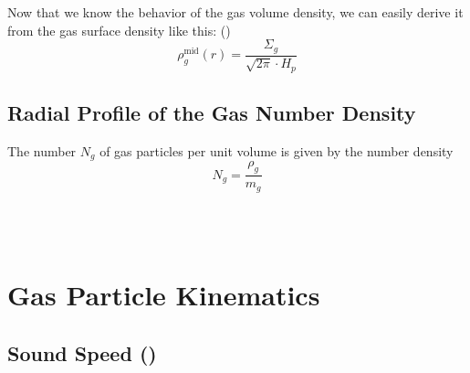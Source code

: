         Now that we know the behavior of the gas volume density, we can easily derive it from 
        the gas surface density like this: ()
        \begin{equation}
            \boxed{\rho_g^\text{mid}(r) =\frac{\Sigma_g}{\sqrt{2\pi}\cdot H_p}}
        \end{equation}

    \subsection{Radial Profile of the Gas Number Density}

        The number $N_g$ of gas particles per unit volume is given by the number density
        \begin{equation}
            N_g
                =\frac{\rho_g}{m_g}
        \end{equation}

         \\
         \\  %


        \clearpage
        




\newpage\section{Gas Particle Kinematics}


    \subsection{Sound Speed ()}

